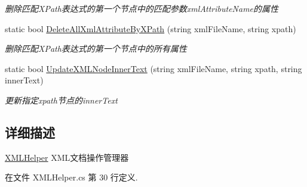 \begin{DoxyCompactItemize}
\begin{DoxyCompactList}\small\item\em 删除匹配\-X\-Path表达式的第一个节点中的匹配参数xml\-Attribute\-Name的属性 \end{DoxyCompactList}\item 
static bool \hyperlink{class_x_c_l_net_tools_1_1_x_m_l_1_1_x_m_l_helper_a07059a8c89a84c359cc9893c842a263e}{Delete\-All\-Xml\-Attribute\-By\-X\-Path} (string xml\-File\-Name, string xpath)
\begin{DoxyCompactList}\small\item\em 删除匹配\-X\-Path表达式的第一个节点中的所有属性 \end{DoxyCompactList}\item 
static bool \hyperlink{class_x_c_l_net_tools_1_1_x_m_l_1_1_x_m_l_helper_a680dbf5fec70c3e5e30d0f75fedc2d3c}{Update\-X\-M\-L\-Node\-Inner\-Text} (string xml\-File\-Name, string xpath, string inner\-Text)
\begin{DoxyCompactList}\small\item\em 更新指定xpath节点的inner\-Text \end{DoxyCompactList}\end{DoxyCompactItemize}


\subsection{详细描述}
\hyperlink{class_x_c_l_net_tools_1_1_x_m_l_1_1_x_m_l_helper}{X\-M\-L\-Helper} X\-M\-L文档操作管理器 



在文件 X\-M\-L\-Helper.\-cs 第 30 行定义.




